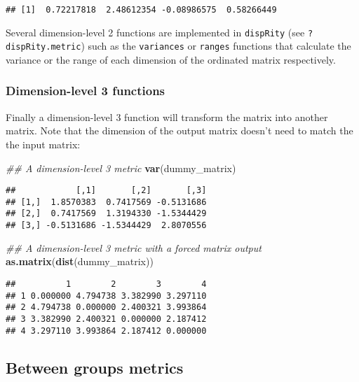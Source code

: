 \documentclass[
]{book}
\newenvironment{Shaded}{\begin{snugshade}}{\end{snugshade}}
\newcommand{\CommentTok}[1]{\textcolor[rgb]{0.56,0.35,0.01}{\textit{#1}}}
\newcommand{\KeywordTok}[1]{\textcolor[rgb]{0.13,0.29,0.53}{\textbf{#1}}}
\newcommand{\NormalTok}[1]{#1}
\begin{document}
\begin{verbatim}
## [1]  0.72217818  2.48612354 -0.08986575  0.58266449
\end{verbatim}

Several dimension-level 2 functions are implemented in \texttt{dispRity} (see \texttt{?dispRity.metric}) such as the \texttt{variances} or \texttt{ranges} functions that calculate the variance or the range of each dimension of the ordinated matrix respectively.

\hypertarget{dimension-level-3-functions}{%
\subsubsection{Dimension-level 3 functions}\label{dimension-level-3-functions}}

Finally a dimension-level 3 function will transform the matrix into another matrix.
Note that the dimension of the output matrix doesn't need to match the the input matrix:

\begin{Shaded}
\begin{Highlighting}[]
\CommentTok{\#\# A dimension{-}level 3 metric}
\KeywordTok{var}\NormalTok{(dummy\_matrix)}
\end{Highlighting}
\end{Shaded}

\begin{verbatim}
##            [,1]       [,2]       [,3]
## [1,]  1.8570383  0.7417569 -0.5131686
## [2,]  0.7417569  1.3194330 -1.5344429
## [3,] -0.5131686 -1.5344429  2.8070556
\end{verbatim}

\begin{Shaded}
\begin{Highlighting}[]
\CommentTok{\#\# A dimension{-}level 3 metric with a forced matrix output}
\KeywordTok{as.matrix}\NormalTok{(}\KeywordTok{dist}\NormalTok{(dummy\_matrix))}
\end{Highlighting}
\end{Shaded}

\begin{verbatim}
##          1        2        3        4
## 1 0.000000 4.794738 3.382990 3.297110
## 2 4.794738 0.000000 2.400321 3.993864
## 3 3.382990 2.400321 0.000000 2.187412
## 4 3.297110 3.993864 2.187412 0.000000
\end{verbatim}

\hypertarget{betweengroupmetricsexplain}{%
\subsection{Between groups metrics}\label{betweengroupmetricsexplain}}
\end{document}
